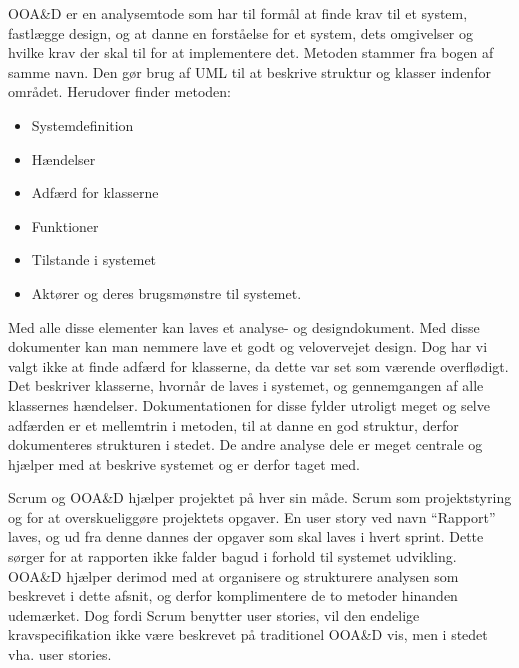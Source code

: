 OOA\&D er en analysemtode som har til formål at finde krav til et system, fastlægge design, og at danne en forståelse for et system, dets omgivelser og hvilke krav der skal til for at implementere det.
Metoden stammer fra bogen af samme navn.\citep{OOA&D2001}
Den gør brug af UML til at beskrive struktur og klasser indenfor området.
Herudover finder metoden:

\begin{itemize}
\item Systemdefinition
\item Hændelser
\item Adfærd for klasserne
\item Funktioner
\item Tilstande i systemet
\item Aktører og deres brugsmønstre til systemet.
\end{itemize}

Med alle disse elementer kan laves et analyse- og designdokument.
Med disse dokumenter kan man nemmere lave et godt og velovervejet design.
Dog har vi valgt ikke at finde adfærd for klasserne, da dette var set som værende overflødigt.
Det beskriver klasserne, hvornår de laves i systemet, og gennemgangen af alle klassernes hændelser. 
Dokumentationen for disse fylder utroligt meget og selve adfærden er et mellemtrin i metoden, til at danne en god struktur, derfor dokumenteres strukturen i stedet.
De andre analyse dele er meget centrale og hjælper med at beskrive systemet og er derfor taget med. 

Scrum og OOA\&D hjælper projektet på hver sin måde.
Scrum som projektstyring og for at overskueliggøre projektets opgaver. 
En user story ved navn ``Rapport'' laves, og ud fra denne dannes der opgaver som skal laves i hvert sprint. 
Dette sørger for at rapporten ikke falder bagud i forhold til systemet udvikling.
OOA\&D hjælper derimod med at organisere og strukturere analysen som beskrevet i dette afsnit, og derfor komplimentere de to metoder hinanden udemærket.
Dog fordi Scrum benytter user stories, vil den endelige kravspecifikation ikke være beskrevet på traditionel OOA\&D vis, men i stedet vha. user stories.









